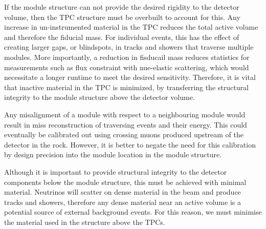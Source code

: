 If the module structure can not provide the desired rigidity to the detector volume, then the TPC structure must be overbuilt to account for this. Any increase in un-instrumented material in the TPC reduces the total active volume and therefore the fiducial mass. For individual events, this has the effect of creating larger gaps, or blindspots, in tracks and showers that traverse multiple modules. More importantly, a reduction in fisducail mass reduces statistics for measurements such as flux constraint with nue-elastic scattering, which would necessitate a longer runtime to meet the desired sensitivity. Therefore, it is vital that inactive material in the TPC is minimized, by transferring the structural integrity to the module structure above the detector volume.

Any misalignment of a module with respect to a neighbouring module would result in miss reconstruction of traversing events and their energy. This could eventually be calibrated out using crossing muons produced upstream of the detector in the rock. However, it is better to negate the need for this calibration by design precision into the module location in the module structure.

Although it is important to provide structural integrity to the detector components below the module structure, this must be achieved with minimal material. Neutrinos will scatter on dense material in the beam and produce tracks and showers, therefore any dense material near an active volume is a potential source of external background events. For this reason, we must minimise the material used in the structure above the TPCs.

